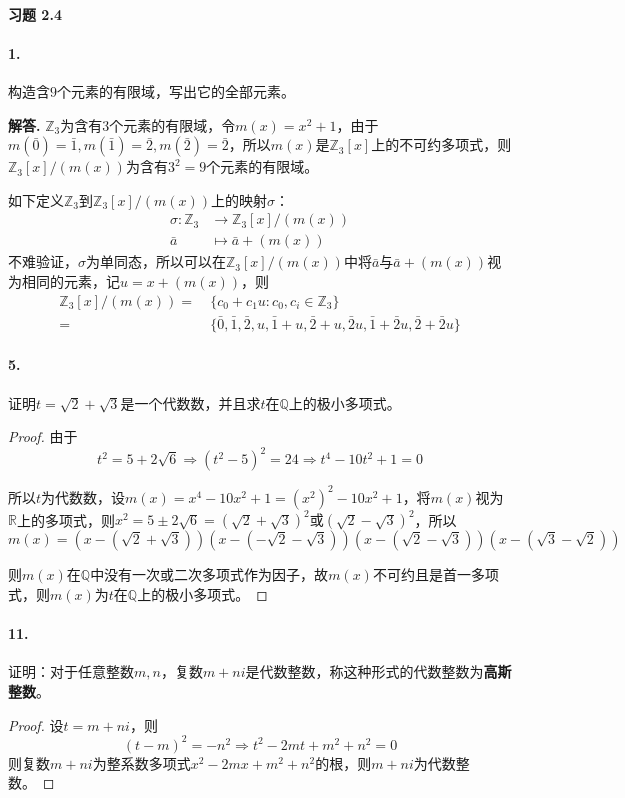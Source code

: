 \documentclass[12pt, a4paper, oneside]{ctexart}
\newenvironment{solution}{\par\noindent\textbf{解答. }}{\bigskip\par}
\begin{document}
\paragraph{习题 2.4}
\paragraph{1.}构造含$9$个元素的有限域，写出它的全部元素。
\begin{solution}
    $\mathbb{Z}_3$为含有$3$个元素的有限域，令$m(x) = x^2+1$，由于$m(\bar{0})=\bar{1},m(\bar{1})=\bar{2},m(\bar{2})=\bar{2}$，所以$m(x)$是$\mathbb{Z}_3[x]$上的不可约多项式，则$\mathbb{Z}_3[x]/(m(x))$为含有$3^2=9$个元素的有限域。

    如下定义$\mathbb{Z}_3$到$\mathbb{Z}_3[x]/(m(x))$上的映射$\sigma$：
    \begin{equation*}
        \begin{aligned}
            \sigma:\mathbb{Z}_3&\rightarrow \mathbb{Z}_3[x]/(m(x))\\
            \bar{a}&\mapsto \bar{a}+(m(x))
        \end{aligned}
    \end{equation*}
    不难验证，$\sigma$为单同态，所以可以在$\mathbb{Z}_3[x]/(m(x))$中将$\bar{a}$与$\bar{a}+(m(x))$视为相同的元素，记$u = x+(m(x))$，则
    \begin{equation*}
        \begin{aligned}
            \mathbb{Z}_3[x]/(m(x)) =&\ \{c_0+c_1u:c_0,c_i\in\mathbb{Z}_3\}\\
            =&\ \{\bar{0},\bar{1},\bar{2},u,\bar{1}+u,\bar{2}+u, \bar{2}u, \bar{1}+\bar{2}u,\bar{2}+\bar{2}u\}
        \end{aligned}
    \end{equation*}
\end{solution}
\paragraph{5.}证明$t=\sqrt{2}+\sqrt{3}$是一个代数数，并且求$t$在$\mathbb{Q}$上的极小多项式。
\begin{proof}
    由于
    \begin{equation*}
    t^2 = 5 + 2\sqrt{6}\Rightarrow (t^2-5)^2=24\Rightarrow t^4-10t^2+1=0
    \end{equation*}

    所以$t$为代数数，设$m(x) = x^4-10x^2+1 = (x^2)^2-10x^2+1$，将$m(x)$视为$\mathbb{R}$上的多项式，则$x^2=5\pm 2\sqrt{6}=(\sqrt{2}+\sqrt{3})^2\text{或}(\sqrt{2}-\sqrt{3})^2$，所以
    \begin{equation*}
        m(x) = (x-(\sqrt{2}+\sqrt{3}))(x-(-\sqrt{2}-\sqrt{3}))(x-(\sqrt{2}-\sqrt{3}))(x-(\sqrt{3}-\sqrt{2}))
    \end{equation*}

    则$m(x)$在$\mathbb{Q}$中没有一次或二次多项式作为因子，故$m(x)$不可约且是首一多项式，则$m(x)$为$t$在$\mathbb{Q}$上的极小多项式。
\end{proof}
\newpage
\paragraph{11.}证明：对于任意整数$m,n$，复数$m+ni$是代数整数，称这种形式的代数整数为\textbf{高斯整数}。
\begin{proof}
    设$t = m+ni$，则
    \begin{equation*}
        (t-m)^2=-n^2\Rightarrow t^2-2mt+m^2+n^2=0
    \end{equation*}
则复数$m+ni$为整系数多项式$x^2-2mx+m^2+n^2$的根，则$m+ni$为代数整数。
\end{proof}
\end{document}
